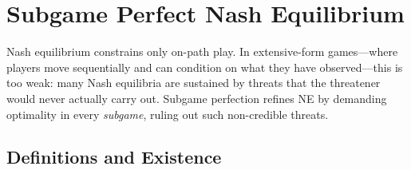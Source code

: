 \section{Subgame Perfect Nash Equilibrium}

Nash equilibrium constrains only on-path play. In extensive-form games---where players move sequentially and can condition on what they have observed---this is too weak: many Nash equilibria are sustained by threats that the threatener would never actually carry out. Subgame perfection refines NE by demanding optimality in every \emph{subgame}, ruling out such non-credible threats.

\subsection{Definitions and Existence}



